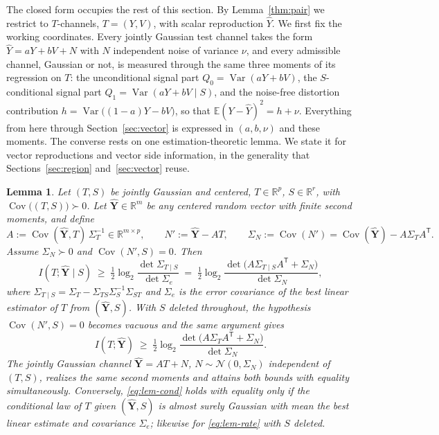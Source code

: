 \documentclass[11pt,onecolumn]{IEEEtran}
\newtheorem{lemma}[theorem]{Lemma}
\newcommand{\E}{\mathbb{E}}
\newcommand{\R}{\mathbb{R}}
\newcommand{\Cov}{\operatorname{Cov}}
\newcommand{\hY}{\widehat{Y}}
\begin{document}
The closed form occupies the rest of this section. By
Lemma~\ref{thm:pair} we restrict to $T$-channels, $T=(Y,V)$, with
scalar reproduction $\hY$. We first fix the working coordinates. Every
jointly Gaussian test channel
takes the form $\hY=aY+bV+N$ with $N$ independent noise of variance
$\nu$, and every admissible channel, Gaussian or not, is measured through
the same three moments of its regression on $T$: the unconditional
signal part $Q_0=\operatorname{Var}(aY+bV)$, the $S$-conditional signal
part $Q_1=\operatorname{Var}(aY+bV\mid S)$, and the noise-free
distortion contribution $h=\operatorname{Var}\bigl((1-a)Y-bV\bigr)$, so
that $\E(Y-\hY)^2=h+\nu$. Everything from here through
Section~\ref{sec:vector} is expressed in $(a,b,\nu)$ and these moments.
The converse rests on one
estimation-theoretic lemma. We state it for vector reproductions and
vector side information, in the generality that
Sections~\ref{sec:region} and~\ref{sec:vector} reuse.

\begin{lemma}
\label{lem:gauss}
Let $(T,S)$ be jointly Gaussian and centered, $T\in\R^p$, $S\in\R^r$,
with $\Cov\bigl((T,S)\bigr)\succ0$. Let $\hat{\mathbf Y}\in\R^m$ be any
centered random vector with finite second moments, and define
\[
A:=\Cov(\hat{\mathbf Y},T)\,\Sigma_T^{-1}\in\R^{m\times p},\qquad
N':=\hat{\mathbf Y}-AT,\qquad
\Sigma_N:=\Cov(N')=\Cov(\hat{\mathbf Y})-A\Sigma_TA^{\mathsf T}.
\]
Assume $\Sigma_N\succ0$ and $\Cov(N',S)=0$. Then
\begin{equation}
I(T;\hat{\mathbf Y}\mid S)\;\ge\;\tfrac12\log_2
\frac{\det\Sigma_{T\mid S}}{\det\Sigma_e}
\;=\;\tfrac12\log_2
\frac{\det\bigl(A\Sigma_{T\mid S}A^{\mathsf T}+\Sigma_N\bigr)}
{\det\Sigma_N},
\label{eq:lem-cond}
\end{equation}
where $\Sigma_{T\mid S}=\Sigma_T-\Sigma_{TS}\Sigma_S^{-1}\Sigma_{ST}$
and $\Sigma_e$ is the error covariance of the best linear estimator of
$T$ from $(\hat{\mathbf Y},S)$. With $S$ deleted throughout, the
hypothesis $\Cov(N',S)=0$ becomes vacuous and the same argument gives
\begin{equation}
I(T;\hat{\mathbf Y})\;\ge\;\tfrac12\log_2
\frac{\det\bigl(A\Sigma_TA^{\mathsf T}+\Sigma_N\bigr)}{\det\Sigma_N}.
\label{eq:lem-rate}
\end{equation}
The jointly Gaussian channel $\hat{\mathbf Y}=AT+N$,
$N\sim\mathcal N(0,\Sigma_N)$ independent of $(T,S)$, realizes the same
second moments and attains both bounds with equality simultaneously.
Conversely, \eqref{eq:lem-cond} holds with equality only if the
conditional law of $T$ given $(\hat{\mathbf Y},S)$ is almost surely
Gaussian with mean the best linear estimate and covariance $\Sigma_e$;
likewise for \eqref{eq:lem-rate} with $S$ deleted.
\end{lemma}
\end{document}
